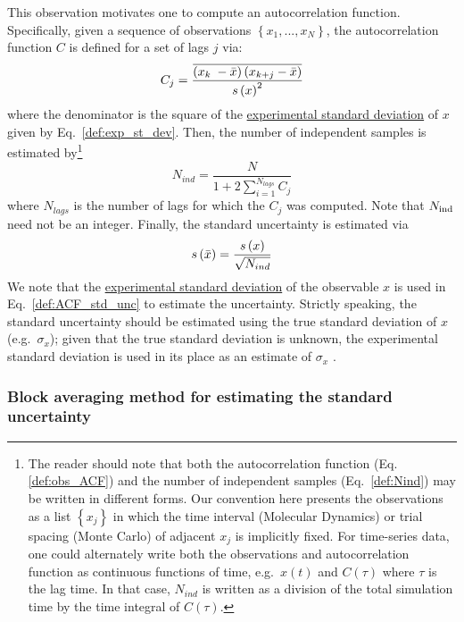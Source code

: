 This observation motivates one to compute an autocorrelation function.  Specifically, given a sequence of observations $\left\{x_1, ..., x_N\right\}$, the autocorrelation function $C$ is defined for a set of lags $j$ via:
%
\begin{equation}
  C_j = \dfrac{
   \overline{
      \left( x_{k{\color{white}j}}\hspace{-1pt} - \mean{x} \right)
      \left( x_{k+j} - \mean{x} \right)
    }
  }
  {\stdev{x}^2}
  \label{def:obs_ACF}
\end{equation}
%
where the denominator is the square of the \hyperref[def:exp_st_dev]{experimental standard deviation} of $x$ given by Eq.~\ref{def:exp_st_dev}.
Then, the number of independent samples is estimated by\footnote{The reader should note that both the autocorrelation function (Eq. \ref{def:obs_ACF}) and the number of independent samples (Eq.~\ref{def:Nind}) may be written in different forms\cite{Grossfield2009,Chodera-2016}. Our convention here presents the observations as a list $\left\{x_j\right\}$ in which the time interval (Molecular Dynamics) or trial spacing (Monte Carlo) of adjacent $x_j$ is implicitly fixed. For time-series data, one could alternately write both the observations and autocorrelation function as continuous functions of time, e.g.~$x\left(t\right)$ and $C\left(\tau\right)$ where $\tau$ is the lag time. In that case, $N_{ind}$ is written as a division of the total simulation time by the time integral of $C\left(\tau\right)$\cite{Grossfield2009}.}
%
\begin{equation}
  N_{ind} = \dfrac{N}{1+2 \sum_{i=1}^{N_{lags}} C_j}
  \label{def:Nind}
\end{equation}
%
where $N_{lags}$ is the number of lags for which the $C_j$ was computed.  Note that $N_{\rm ind}$ need not be an integer.
Finally, the standard uncertainty is estimated via
%
\begin{equation}
  s\left( \bar{x} \right) = \dfrac{s\left( x \right)}{\sqrt{N_{ind}}}
  \label{def:ACF_std_unc}
\end{equation}
%
We note that the \hyperref[def:exp_st_dev]{experimental standard deviation} of the observable $x$ is used in Eq.~\ref{def:ACF_std_unc} to estimate the uncertainty. Strictly speaking, the standard uncertainty should be estimated using the true standard deviation of $x$ (e.g.\ $\sigma_x$); given that the true standard deviation is unknown, the experimental standard deviation is used in its place as an estimate of $\sigma_x$ \cite{PatroneAIAA}.

\subsubsection{Block averaging method for estimating the standard uncertainty}\label{sec:blockavg}

